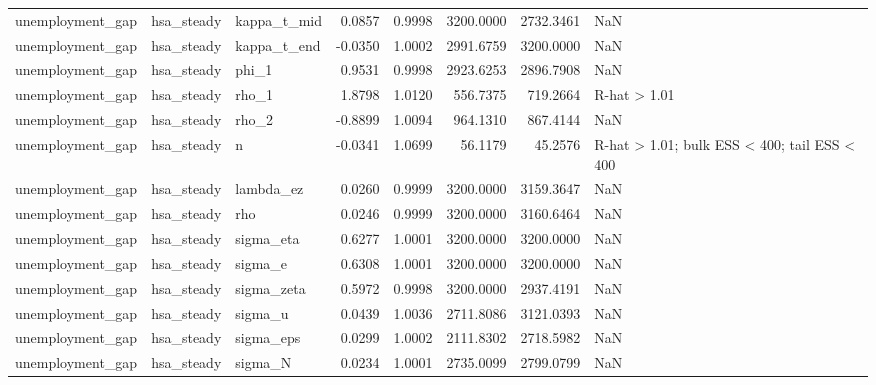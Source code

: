 \begin{tabular}{lllrrrrl}
unemployment\_gap & hsa\_steady & kappa\_t\_mid & 0.0857 & 0.9998 & 3200.0000 & 2732.3461 & NaN \\
unemployment\_gap & hsa\_steady & kappa\_t\_end & -0.0350 & 1.0002 & 2991.6759 & 3200.0000 & NaN \\
unemployment\_gap & hsa\_steady & phi\_1 & 0.9531 & 0.9998 & 2923.6253 & 2896.7908 & NaN \\
unemployment\_gap & hsa\_steady & rho\_1 & 1.8798 & 1.0120 & 556.7375 & 719.2664 & R-hat > 1.01 \\
unemployment\_gap & hsa\_steady & rho\_2 & -0.8899 & 1.0094 & 964.1310 & 867.4144 & NaN \\
unemployment\_gap & hsa\_steady & n & -0.0341 & 1.0699 & 56.1179 & 45.2576 & R-hat > 1.01; bulk ESS < 400; tail ESS < 400 \\
unemployment\_gap & hsa\_steady & lambda\_ez & 0.0260 & 0.9999 & 3200.0000 & 3159.3647 & NaN \\
unemployment\_gap & hsa\_steady & rho & 0.0246 & 0.9999 & 3200.0000 & 3160.6464 & NaN \\
unemployment\_gap & hsa\_steady & sigma\_eta & 0.6277 & 1.0001 & 3200.0000 & 3200.0000 & NaN \\
unemployment\_gap & hsa\_steady & sigma\_e & 0.6308 & 1.0001 & 3200.0000 & 3200.0000 & NaN \\
unemployment\_gap & hsa\_steady & sigma\_zeta & 0.5972 & 0.9998 & 3200.0000 & 2937.4191 & NaN \\
unemployment\_gap & hsa\_steady & sigma\_u & 0.0439 & 1.0036 & 2711.8086 & 3121.0393 & NaN \\
unemployment\_gap & hsa\_steady & sigma\_eps & 0.0299 & 1.0002 & 2111.8302 & 2718.5982 & NaN \\
unemployment\_gap & hsa\_steady & sigma\_N & 0.0234 & 1.0001 & 2735.0099 & 2799.0799 & NaN \\
\bottomrule
\end{tabular}
